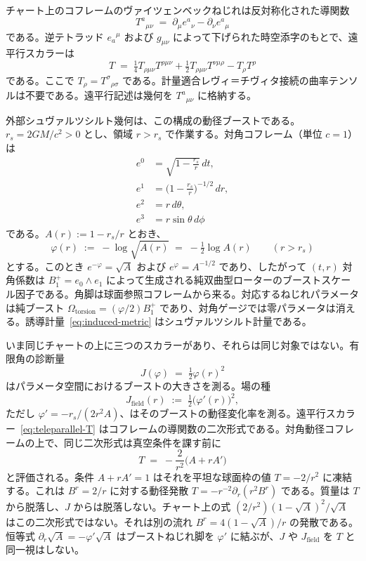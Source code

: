 \documentclass[a4paper]{article}
\begin{document}
チャート上のコフレームのヴァイツェンベックねじれは反対称化された導関数
\begin{equation}
T^{a}{}_{\mu\nu} \;=\; \partial_{\mu} e^{a}{}_{\nu} - \partial_{\nu} e^{a}{}_{\mu}
\label{eq:weitzenbock-torsion}
\end{equation}
である。逆テトラッド \(e_{a}{}^{\mu}\) および \(g_{\mu\nu}\) によって下げられた時空添字のもとで、遠平行スカラーは
\begin{equation}
T \;=\; \tfrac14 T_{\rho\mu\nu}T^{\rho\mu\nu} + \tfrac12 T_{\rho\mu\nu}T^{\nu\mu\rho} - T_{\rho}T^{\rho}
\label{eq:teleparallel-T}
\end{equation}
である。ここで \(T_{\rho}=T^{\sigma}{}_{\rho\sigma}\) である。計量適合レヴィ＝チヴィタ接続の曲率テンソルは不要である。遠平行記述は幾何を \(T^{a}{}_{\mu\nu}\) に格納する。

外部シュヴァルツシルト幾何は、この構成の動径ブーストである。\(r_{s}=2GM/c^{2}>0\) とし、領域 \(r>r_{s}\) で作業する。対角コフレーム（単位 \(c=1\)）は
\begin{align}
e^{0} &= \sqrt{1-\frac{r_{s}}{r}}\,dt,\nonumber\\
e^{1} &= \bigl(1-\frac{r_{s}}{r}\bigr)^{-1/2}\,dr,\nonumber\\
e^{2} &= r\,d\theta,\nonumber\\
e^{3} &= r\sin\theta\,d\phi
\label{eq:schwarzschild-tetrad}
\end{align}
である。\(A(r):=1-r_{s}/r\) とおき、
\begin{equation}
\varphi(r) \;:=\; -\log\sqrt{A(r)} \;=\; -\tfrac12\log A(r)
\qquad(r>r_{s})
\label{eq:radial-rapidity}
\end{equation}
とする。このとき \(e^{-\varphi}=\sqrt{A}\) および \(e^{\varphi}=A^{-1/2}\) であり、したがって \((t,r)\) 対角係数は \(B^{+}_{1}=e_{0}\wedge e_{1}\) によって生成される純双曲型ローターのブーストスケール因子である。角脚は球面参照コフレームから来る。対応するねじれパラメータは純ブースト \(\Omega_{\mathrm{torsion}}=(\varphi/2)B^{+}_{1}\) であり、対角ゲージでは零パラメータは消える。誘導計量~\eqref{eq:induced-metric} はシュヴァルツシルト計量である。

いま同じチャートの上に三つのスカラーがあり、それらは同じ対象ではない。有限角の診断量
\[
J(\varphi) \;=\; \tfrac12\varphi(r)^{2}
\]
はパラメータ空間におけるブーストの大きさを測る。場の種
\begin{equation}
J_{\mathrm{field}}(r) \;:=\; \tfrac12\bigl(\varphi'(r)\bigr)^{2},
\label{eq:J-field}
\end{equation}
ただし \(\varphi'=-r_{s}/(2r^{2}A)\)、はそのブーストの動径変化率を測る。遠平行スカラー~\eqref{eq:teleparallel-T} はコフレームの導関数の二次形式である。対角動径コフレームの上で、同じ二次形式は真空条件を課す前に
\[
T \;=\; -\frac{2}{r^{2}}\bigl(A+r A'\bigr)
\]
と評価される。条件 \(A+r A'=1\) はそれを平坦な球面枠の値 \(T=-2/r^{2}\) に凍結する。これは \(B^{r}=2/r\) に対する動径発散 \(T=-r^{-2}\partial_{r}(r^{2}B^{r})\) である。質量は \(T\) から脱落し、\(J\) からは脱落しない。チャート上の式 \((2/r^{2})(1-\sqrt{A})^{2}/\sqrt{A}\) はこの二次形式ではない。それは別の流れ \(B^{r}=4(1-\sqrt{A})/r\) の発散である。恒等式 \(\partial_{r}\sqrt{A}=-\varphi'\sqrt{A}\) はブーストねじれ脚を \(\varphi'\) に結ぶが、\(J\) や \(J_{\mathrm{field}}\) を \(T\) と同一視はしない。
\end{document}
